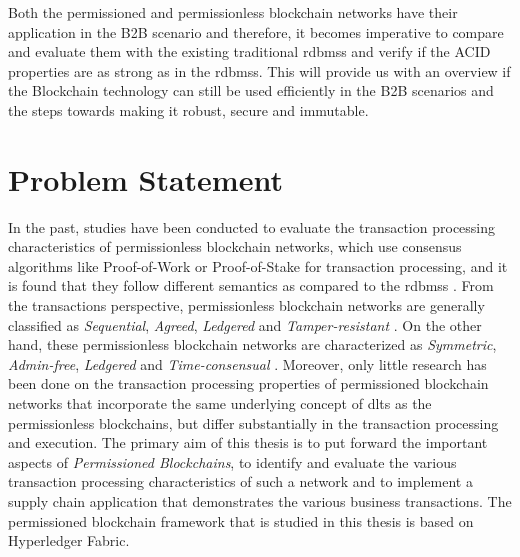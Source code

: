 \documentclass[
  a4paper,  %
  twoside,  %
  bibliography=totoc,
  headsepline,
  cleardoublepage=empty,
  parskip=half,
  draft=false
]{scrbook}
\begin{document}
Both the permissioned and permissionless blockchain networks have their application in the B2B scenario and therefore, it becomes imperative to compare and evaluate them with the existing traditional \glspl{rdbms} and verify if the ACID properties are as strong as in the \glspl{rdbms}. This will provide us with an overview if the Blockchain technology can still be used efficiently in the B2B scenarios and the steps towards making it robust, secure and immutable.

\section{Problem Statement}
In the past, studies have been conducted to evaluate the transaction processing characteristics of permissionless blockchain
networks, which use consensus algorithms like Proof-of-Work or Proof-of-Stake for transaction processing, and it is found that they follow different semantics as compared to the \glspl{rdbms} \cite{Salt}. From the transactions perspective, permissionless blockchain networks are generally classified as \textit{Sequential}, \textit{Agreed}, \textit{Ledgered} and \textit{Tamper-resistant} \cite{Salt}. On the other hand, these permissionless blockchain networks are characterized as \textit{Symmetric}, \textit{Admin-free}, \textit{Ledgered} and \textit{Time-consensual} \cite{Salt}. Moreover, only little research has been done on the transaction processing properties of permissioned blockchain networks that incorporate the same underlying concept of \glspl{dlt} as the permissionless blockchains, but differ substantially in the transaction processing
and execution. The primary aim of this thesis is to put forward the important aspects of \textit{Permissioned Blockchains}, to identify and evaluate the various transaction processing characteristics of such a network and to implement a supply chain application that demonstrates the various business transactions. The permissioned blockchain framework that is studied in this thesis is based on Hyperledger Fabric.
\end{document}

